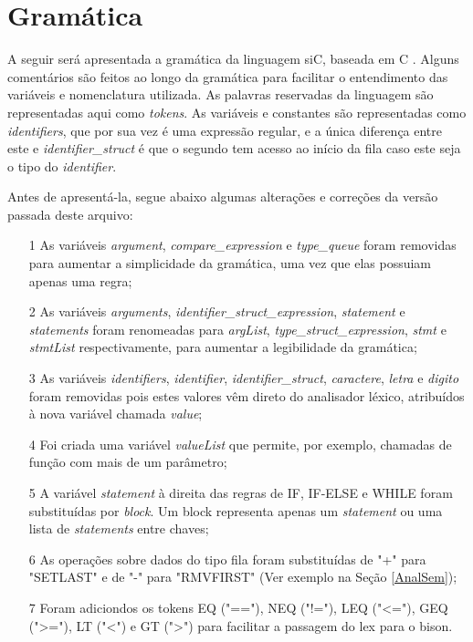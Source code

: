 \documentclass[12pt]{article}
\begin{document}
\section{Gramática}

\indent A seguir será apresentada a gramática da linguagem siC, baseada em C \cite{yacc}. Alguns comentários são feitos ao longo da gramática para facilitar o entendimento das variáveis e nomenclatura utilizada. As palavras reservadas da linguagem são representadas aqui como \textit{tokens}. As variáveis e constantes são representadas como \textit{identifiers}, que por sua vez é uma expressão regular, e a única diferença entre este e \textit{identifier\_struct} é que o segundo tem acesso ao início da fila caso este seja o tipo do \textit{identifier}. 

\indent Antes de apresentá-la, segue abaixo algumas alterações e correções da versão passada deste arquivo:

\begin{itemize}
	\item[1] As variáveis \textit{argument}, \textit{compare\_expression} e \textit{type\_queue} foram removidas para aumentar a simplicidade da gramática, uma vez que elas possuiam apenas uma regra;
	\item[2] As variáveis \textit{arguments}, \textit{identifier\_struct\_expression}, \textit{statement} e \textit{statements} foram renomeadas para \textit{argList}, \textit{type\_struct\_expression}, \textit{stmt} e \textit{stmtList} respectivamente, para aumentar a legibilidade da gramática;
	\item[3] As variáveis \textit{identifiers}, \textit{identifier}, \textit{identifier\_struct}, \textit{caractere}, \textit{letra} e \textit{digito} foram removidas pois estes valores vêm direto do analisador léxico, atribuídos à nova variável chamada \textit{value};
	\item[4] Foi criada uma variável \textit{valueList} que permite, por exemplo, chamadas de função com mais de um parâmetro;
	\item[5] A variável \textit{statement} à direita das regras de IF, IF-ELSE e WHILE foram substituídas por \textit{block}. Um block representa apenas um \textit{statement} ou uma lista de \textit{statements} entre chaves;
	\item[6] As operações sobre dados do tipo fila foram substituídas de "+" para "SETLAST" e de "-" para "RMVFIRST" (Ver exemplo na Seção \ref{AnalSem});
	\item[7] Foram adiciondos os tokens EQ ("=="), NEQ ("!="), LEQ ("<="), GEQ (">="), LT ("<") e GT (">") para facilitar a passagem do lex para o bison.
\end{itemize}
\end{document}
